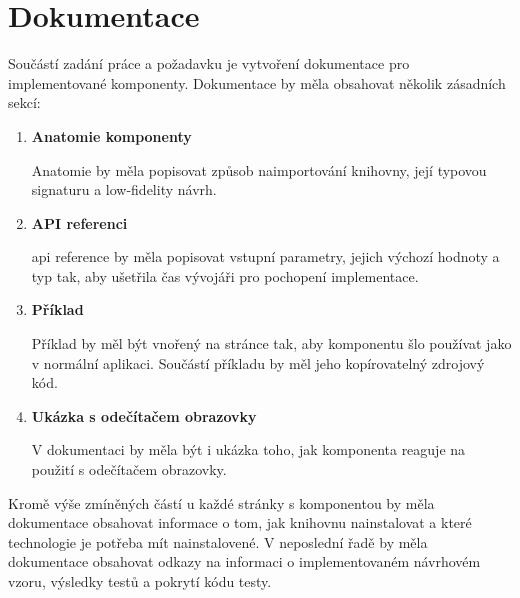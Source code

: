 





\section{Dokumentace}

Součástí zadání práce a požadavku \hyperref[nfr14]{} je vytvoření dokumentace pro implementované komponenty.
Dokumentace by měla obsahovat několik zásadních sekcí:

\begin{enumerate}
    \item \textbf{Anatomie komponenty}

          Anatomie by měla popisovat způsob naimportování knihovny, její typovou signaturu a low-fidelity návrh.

    \item \textbf{API referenci}

          \gls{api} reference by měla popisovat vstupní parametry, jejich výchozí hodnoty a typ tak, aby ušetřila čas vývojáři pro pochopení implementace.

    \item \textbf{Příklad}

          Příklad by měl být vnořený na stránce tak, aby komponentu šlo používat jako v normální aplikaci. Součástí příkladu by měl jeho kopírovatelný zdrojový kód.

    \item \textbf{Ukázka s odečítačem obrazovky}

          V dokumentaci by měla být i ukázka toho, jak komponenta reaguje na použití s odečítačem obrazovky.

\end{enumerate}

Kromě výše zmíněných částí u každé stránky s komponentou by měla dokumentace obsahovat informace o tom, jak knihovnu nainstalovat a které technologie je potřeba mít nainstalovené.
V neposlední řadě by měla dokumentace obsahovat odkazy na informaci o implementovaném návrhovém vzoru, výsledky testů a pokrytí kódu testy.
